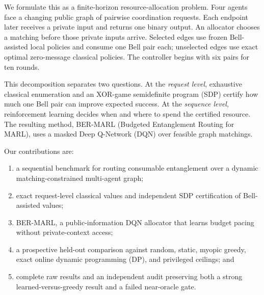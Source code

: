 \documentclass[10pt,twocolumn]{article}
\newcommand{\method}{\textsc{BER-MARL}}
\begin{document}
We formulate this as a finite-horizon resource-allocation problem. Four agents face a changing public graph of pairwise coordination requests. Each endpoint later receives a private input and returns one binary output. An allocator chooses a matching before those private inputs arrive. Selected edges use frozen Bell-assisted local policies and consume one Bell pair each; unselected edges use exact optimal zero-message classical policies. The controller begins with six pairs for ten rounds.

This decomposition separates two questions. At the \emph{request level}, exhaustive classical enumeration and an XOR-game semidefinite program (SDP) certify how much one Bell pair can improve expected success. At the \emph{sequence level}, reinforcement learning decides when and where to spend the certified resource. The resulting method, \method{} (Budgeted Entanglement Routing for MARL), uses a masked Deep Q-Network (DQN) \cite{mnih2015human} over feasible graph matchings.

Our contributions are:
\begin{enumerate}
  \item a sequential benchmark for routing consumable entanglement over a dynamic matching-constrained multi-agent graph;
  \item exact request-level classical values and independent SDP certification of Bell-assisted values;
  \item \method, a public-information DQN allocator that learns budget pacing without private-context access;
  \item a prospective held-out comparison against random, static, myopic greedy, exact online dynamic programming (DP), and privileged ceilings; and
  \item complete raw results and an independent audit preserving both a strong learned-versus-greedy result and a failed near-oracle gate.
\end{enumerate}
\end{document}
